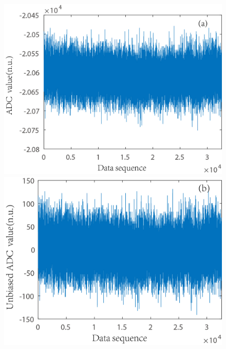 \documentclass[%
 reprint,
superscriptaddress,
 amsmath,amssymb,
 aps,
]{revtex4-1}
\begin{document}
\begin{figure}
\begin{minipage}{0.45\linewidth}
\centering
\includegraphics[width = 1\textwidth]{figure/no-counts-biased.jpg}%
\end{minipage}
\begin{minipage}{0.45\linewidth}
\centering
\includegraphics[width = 1\textwidth]{figure/no-counts.jpg}%
\end{minipage}


\end{figure}
\end{document}
